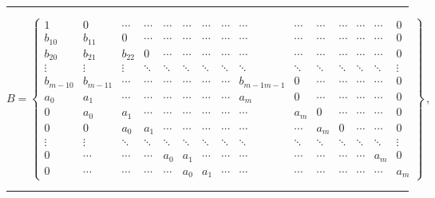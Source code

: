 \hrule

\vspace*{9pt}

\noindent
$$
B=\left\{
\begin{array}{ccccccccccccccc} %
1        & 0        & \cdots &\cdots &\cdots &\cdots &\cdots &\cdots &\cdots    &\cdots &\cdots &\cdots &\cdots &\cdots &0\\
b_{10}   & b_{11}   & 0      &\cdots &\cdots &\cdots &\cdots &\cdots &\cdots    &\cdots &\cdots &\cdots &\cdots &\cdots &0\\
b_{20}   & b_{21}   & b_{22} & 0     &\cdots &\cdots &\cdots &\cdots &\cdots    &\cdots &\cdots &\cdots &\cdots &\cdots &0\\
\vdots   &\vdots    &\vdots  &\ddots &\ddots &\ddots &\ddots &\ddots &\ddots    &\ddots &\ddots &\ddots &\ddots &\ddots &\vdots \\
b_{m-10} & b_{m-11} & \cdots & \cdots&\cdots &\cdots &\cdots &\cdots &b_{m-1m-1}&   0   &\cdots &\cdots &\cdots &\cdots &0\\
a_0      & a_1      & \cdots & \cdots&\cdots &\cdots &\cdots &\cdots &a_m       & 0     &\cdots &\cdots &\cdots &\cdots &0\\
0        & a_0      & a_1    & \cdots&\cdots &\cdots &\cdots &\cdots &\cdots    &a_m    & 0     &\cdots &\cdots &\cdots &0\\
0        & 0        & a_0    & a_1   &\cdots &\cdots &\cdots &\cdots &\cdots    &\cdots &   a_m & 0     &\cdots &\cdots &0\\
\vdots   & \vdots   & \ddots &\ddots &\ddots &\ddots &\ddots &\ddots &\ddots    &\ddots &\ddots &\ddots &\ddots &\ddots & \vdots\\
0        & \cdots   & \cdots & \cdots&  a_0  & a_1   &\cdots &\cdots & \cdots   &\cdots &\cdots & \cdots&\cdots & a_m   & 0\\
0        & \cdots   & \cdots & \cdots&\cdots & a_0   & a_1   &\cdots & \cdots   &\cdots &\cdots & \cdots&\cdots & \cdots& a_m
\end{array}
\right \}
\,,
$$

\vspace*{3pt}

\hrule

